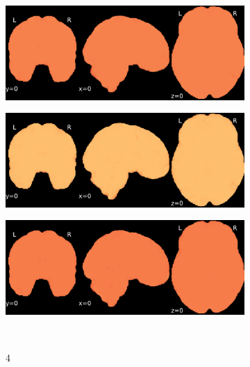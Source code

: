 \documentclass{article}
\begin{document}
\begin{appendices}
\begin{landscape}
\begin{figure}
\begin{subfigure}[t]{0.2\paperheight}
            \end{subfigure}
            \begin{subfigure}[t]{0.2\paperheight}
                \centering
                \includegraphics[width=\textwidth]{figures/sig/5mm/rr_ds000256_sub-CTS201_sig.pdf}
            \end{subfigure}
            \begin{subfigure}[t]{0.2\paperheight}
                \centering
                \includegraphics[width=\textwidth]{figures/sig/5mm/rs_ds000256_sub-CTS201_sig.pdf}
            \end{subfigure}
            \begin{subfigure}[t]{0.2\paperheight}
                \centering
                \includegraphics[width=\textwidth]{figures/sig/5mm/rr.rs_ds000256_sub-CTS201_sig.pdf}
            \end{subfigure} \\
            \begin{subfigure}[b][][c]{0.01\paperwidth} 4 \vspace*{15pt} \end{subfigure}

\end{figure}
\end{landscape}
\end{appendices}
\end{document}
